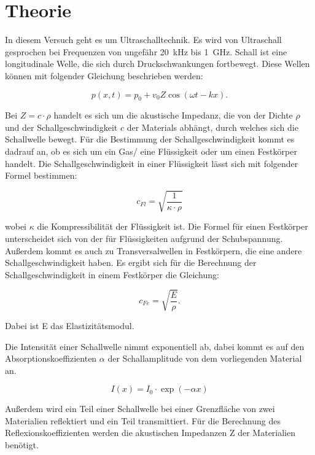 \section{Theorie}

In diesem Versuch geht es um Ultraschalltechnik. Es wird von Ultraschall gesprochen
bei Frequenzen von ungefähr \SI{20}{\kilo\hertz} bis \SI{1}{\giga\hertz}. Schall ist
eine longitudinale Welle, die sich durch Druckschwankungen fortbewegt. Diese Wellen
können mit folgender Gleichung beschrieben werden:

\begin{equation*}
  p(x,t) = p_0 + v_0 Z \cos(\omega t - k x).
\end{equation*}

Bei $Z = c \cdot \rho$ handelt es sich um die akustische Impedanz, die von der
Dichte $\rho$ und der Schallgeschwindigkeit $c$ der Materials abhängt, durch welches
sich die Schallwelle bewegt. Für die Bestimmung der Schallgeschwindigkeit kommt es
dadrauf an, ob es sich um ein Gas/ eine Flüssigkeit oder um einen Festkörper handelt.
Die Schallgeschwindigkeit in einer Flüssigkeit lässt sich mit folgender Formel bestimmen:

\begin{equation*}
  c_{Fl} = \sqrt{\frac{1}{\kappa \cdot \rho}}
\end{equation*}

wobei $\kappa$ die Kompressibilität der Flüssigkeit ist. Die Formel für einen Festkörper
unterscheidet sich von der für Flüssigkeiten aufgrund der Schubspannung. Außerdem kommt es
auch zu Transversalwellen in Festkörpern, die eine andere Schallgeschwindigkeit haben.
Es ergibt sich für die Berechnung der Schallgeschwindigkeit in einem Festkörper die
Gleichung:

\begin{equation*}
  c_{Fe} = \sqrt{\frac{E}{\rho}}.
\end{equation*}

Dabei ist E das Elastizitätsmodul.

Die Intensität einer Schallwelle nimmt exponentiell ab, dabei kommt es auf den
Absorptionskoeffizienten $\alpha$ der Schallamplitude von dem vorliegenden Material an.

\begin{equation*}
  I (x) = I_0 \cdot \exp(-\alpha x)
\end{equation*}

Außerdem wird ein Teil einer Schallwelle bei einer Grenzfläche von zwei Materialien
reflektiert und ein Teil transmittiert. Für die Berechnung des Reflexionskoeffizienten
werden die akustischen Impedanzen Z der Materialien benötigt.

